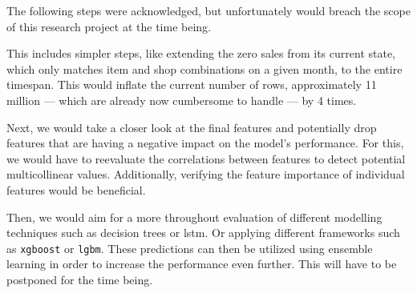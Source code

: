 The following steps were acknowledged, but unfortunately would breach the scope of this research project at the time being.

This includes simpler steps, like extending the zero sales from its current state, which only matches item and shop combinations on a given month, to the entire timespan.
This would inflate the current number of rows, approximately 11 million --- which are already now cumbersome to handle --- by 4 times.

Next, we would take a closer look at the final features and potentially drop features that are having a negative impact on the model's performance. For this, we would have to reevaluate the correlations between features to detect potential multicollinear values. Additionally, verifying the feature importance of individual features would be beneficial.

Then, we would aim for a more throughout evaluation of different modelling techniques such as decision trees or \acrshort{lstm}. Or applying different frameworks such as \texttt{xgboost} or \texttt{\acrshort{lgbm}}.
These predictions can then be utilized using ensemble learning in order to increase the performance even further. This will have to be postponed for the time being.
